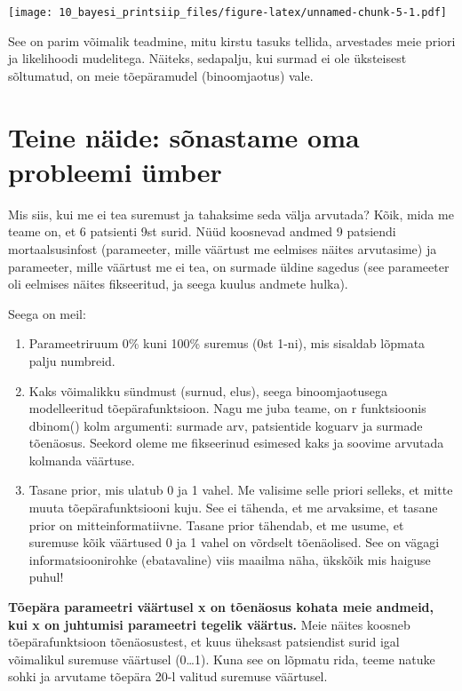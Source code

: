\documentclass[]{book}
\begin{document}
\texttt{[image: 10\_bayesi\_printsiip\_files/figure-latex/unnamed-chunk-5-1.pdf]}

See on parim võimalik teadmine, mitu kirstu tasuks tellida, arvestades meie priori ja likelihoodi mudelitega. Näiteks, sedapalju, kui surmad ei ole üksteisest sõltumatud, on meie tõepäramudel (binoomjaotus) vale.

\hypertarget{teine-naide-sonastame-oma-probleemi-umber}{%
\section*{Teine näide: sõnastame oma probleemi ümber}\label{teine-naide-sonastame-oma-probleemi-umber}}

Mis siis, kui me ei tea suremust ja tahaksime seda välja arvutada?
Kõik, mida me teame on, et 6 patsienti 9st surid.
Nüüd koosnevad andmed 9 patsiendi mortaalsusinfost (parameeter, mille väärtust me eelmises näites arvutasime) ja parameeter, mille väärtust me ei tea, on surmade üldine sagedus (see parameeter oli eelmises näites fikseeritud, ja seega kuulus andmete hulka).

Seega on meil:

\begin{enumerate}
\def\labelenumi{\arabic{enumi}.}
\item
  Parameetriruum 0\% kuni 100\% suremus (0st 1-ni), mis sisaldab lõpmata palju numbreid.
\item
  Kaks võimalikku sündmust (surnud, elus), seega binoomjaotusega modelleeritud tõepärafunktsioon. Nagu me juba teame, on r funktsioonis dbinom() kolm argumenti: surmade arv, patsientide koguarv ja surmade tõenäosus. Seekord oleme me fikseerinud esimesed kaks ja soovime arvutada kolmanda väärtuse.
\item
  Tasane prior, mis ulatub 0 ja 1 vahel. Me valisime selle priori selleks, et mitte muuta tõepärafunktsiooni kuju. See ei tähenda, et me arvaksime, et tasane prior on mitteinformatiivne. Tasane prior tähendab, et me usume, et suremuse kõik väärtused 0 ja 1 vahel on võrdselt tõenäolised. See on vägagi informatsioonirohke (ebatavaline) viis maailma näha, ükskõik mis haiguse puhul!
\end{enumerate}

\textbf{Tõepära parameetri väärtusel x on tõenäosus kohata meie andmeid, kui x on juhtumisi parameetri tegelik väärtus.} Meie näites koosneb tõepärafunktsioon tõenäosustest, et kuus üheksast patsiendist surid igal võimalikul suremuse väärtusel (0\ldots{}1). Kuna see on lõpmatu rida, teeme natuke sohki ja arvutame tõepära 20-l valitud suremuse väärtusel.
\end{document}
